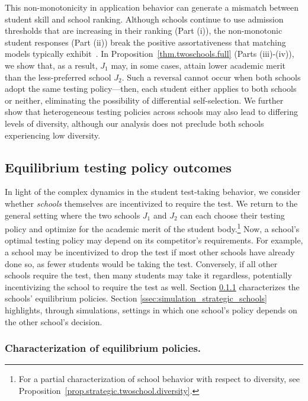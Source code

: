 This non-monotonicity in application behavior can generate a mismatch between student skill and school ranking. Although schools continue to use admission thresholds that are increasing in their ranking (Part (i)), the non-monotonic student responses (Part (ii)) break the positive assortativeness that matching models typically exhibit~\citep{chade2017sorting}. %
In Proposition~\ref{thm.twoschools.full} (Parts (iii)-(iv)), we show that, as a result, $J_1$ may, in some cases, attain lower academic merit than the less-preferred school $J_2$. Such a reversal cannot occur when both schools adopt the same testing policy---then, each student either applies to both schools or neither, eliminating the possibility of differential self-selection. We further show that heterogeneous testing policies across schools may also lead to differing levels of diversity, although our analysis does not preclude both schools experiencing low diversity.



\subsection{Equilibrium testing policy outcomes}
In light of the complex dynamics in the student test-taking behavior, we consider whether \textit{schools} themselves are incentivized to require the test.
We return to the general setting where the two schools $J_1$ and $J_2$ can each choose their testing policy and optimize for the academic merit of the student body.\footnote{{For a partial characterization of school behavior with respect to  diversity, see Proposition~\ref{prop.strategic.twoschool.diversity}.}} Now, a school's optimal testing policy may depend on its competitor's requirements. For example, a school may be incentivized to drop the test if most other schools have already done so, as fewer students would be taking the test.
Conversely, if all other schools require the test, then many students may take it regardless, potentially incentivizing the school to require the test as well. Section \ref{ssec:two_schools_strategic_theory}
characterizes the schools' equilibrium policies. Section
\ref{ssec:simulation_strategic_schools} highlights, through simulations, settings in which one school's policy depends on the other school's decision.



\subsubsection{Characterization of equilibrium policies.}
\label{ssec:two_schools_strategic_theory}


